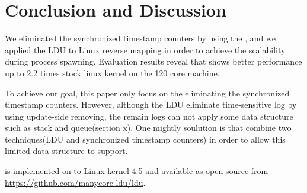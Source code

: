 \section{Conclusion and Discussion}
We eliminated the synchronized timestamp counters by using the , and
we applied the LDU to Linux reverse mapping in order to achieve the scalability
during process spawning.
Evaluation results reveal that  shows better performance up to 2.2 times
stock linux kernel on the 120 core machine.

To achieve our goal, this paper only focus on the eliminating the synchronized
timestamp counters.
However, although the LDU eliminate time-sensitive log by using update-side
removing, the remain logs can not apply some data structure such as stack and
queue(section x).
One mightly soulution is that combine two techniques(LDU and synchronized
timestamp counters) in order to allow this limited data structure to support.

 is implemented on to Linux kernel 4.5 and available as open-source
 from \url{https://github.com/manycore-ldu/ldu}.


